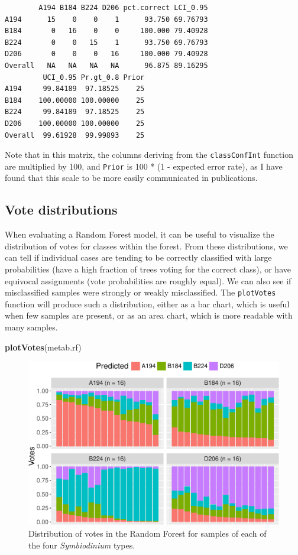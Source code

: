 \documentclass[]{article}
\newenvironment{Shaded}{\begin{snugshade}}{\end{snugshade}}
\newcommand{\KeywordTok}[1]{\textcolor[rgb]{0.13,0.29,0.53}{\textbf{{#1}}}}
\newcommand{\NormalTok}[1]{{#1}}
\begin{document}
\begin{verbatim}
        A194 B184 B224 D206 pct.correct LCI_0.95
A194      15    0    0    1      93.750 69.76793
B184       0   16    0    0     100.000 79.40928
B224       0    0   15    1      93.750 69.76793
D206       0    0    0   16     100.000 79.40928
Overall   NA   NA   NA   NA      96.875 89.16295
         UCI_0.95 Pr.gt_0.8 Prior
A194     99.84189  97.18525    25
B184    100.00000 100.00000    25
B224     99.84189  97.18525    25
D206    100.00000 100.00000    25
Overall  99.61928  99.99893    25
\end{verbatim}

Note that in this matrix, the columns deriving from the
\texttt{classConfInt} function are multiplied by 100, and \texttt{Prior}
is 100 * (1 - expected error rate), as I have found that this scale to
be more easily communicated in publications.

\subsection{Vote distributions}\label{vote-distributions}

When evaluating a Random Forest model, it can be useful to visualize the
distribution of votes for classes within the forest. From these
distributions, we can tell if individual cases are tending to be
correctly classified with large probabilities (have a high fraction of
trees voting for the correct class), or have equivocal assignments (vote
probabilities are roughly equal). We can also see if misclassified
samples were strongly or weakly misclassified. The \texttt{plotVotes}
function will produce such a distribution, either as a bar chart, which
is useful when few samples are present, or as an area chart, which is
more readable with many samples.

\begin{Shaded}
\begin{Highlighting}[]
\KeywordTok{plotVotes}\NormalTok{(metab.rf)}
\end{Highlighting}
\end{Shaded}

\begin{figure}[htbp]
\centering
\includegraphics{rfPermute_ms_files/figure-latex/plotVotes-1.pdf}
\caption{Distribution of votes in the Random Forest for samples of each
of the four \emph{Symbiodinium} types.}
\end{figure}
\end{document}
